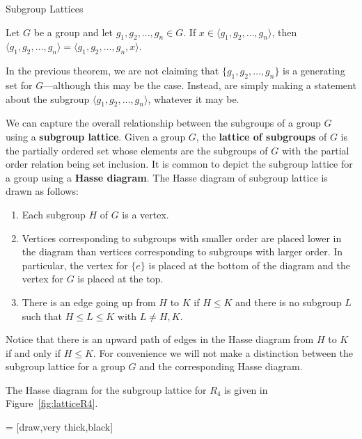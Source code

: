 \begin{section}{Subgroup Lattices}
\begin{theorem}
Let $G$ be a group and let $g_1,g_2,\ldots,g_n\in G$.  If $x\in\langle g_1,g_2,\ldots,g_n\rangle$, then $\langle g_1,g_2,\ldots,g_n\rangle = \langle g_1,g_2,\ldots,g_n,x\rangle$.
\end{theorem}

In the previous theorem, we are not claiming that $\{g_1,g_2,\ldots,g_n\}$ is a generating set for $G$---although this may be the case.  Instead, are simply making a statement about the subgroup $\langle g_1,g_2,\ldots,g_n\rangle$, whatever it may be.

We can capture the overall relationship between the subgroups of a group $G$ using a \textbf{subgroup lattice}.  Given a group $G$, the \textbf{lattice of subgroups} of $G$ is the partially ordered set whose elements are the subgroups of $G$ with the partial order relation being set inclusion. It is common to depict the subgroup lattice for a group using a \textbf{Hasse diagram}.  The Hasse diagram of subgroup lattice is drawn as follows:
\begin{enumerate}[label=\rm{(\arabic*)}]
\item Each subgroup $H$ of $G$ is a vertex.
\item Vertices corresponding to subgroups with smaller order are placed lower in the diagram than vertices corresponding to subgroups with larger order.  In particular, the vertex for $\{e\}$ is placed at the bottom of the diagram and the vertex for $G$ is placed at the top.
\item There is an edge going up from $H$ to $K$ if $H\leq K$ and there is no subgroup $L$ such that $H\leq L\leq K$ with $L\neq H,K$.
\end{enumerate}
Notice that there is an upward path of edges in the Hasse diagram from $H$ to $K$ if and only if $H\leq K$. For convenience we will not make a distinction between the subgroup lattice for a group $G$ and the corresponding Hasse diagram. 

The Hasse diagram for the subgroup lattice for $R_4$ is given in Figure~\ref{fig:latticeR4}.

 = [draw,very thick,black]

\begin{figure}[!ht]
\centering
{}
\end{figure}
\end{section}
